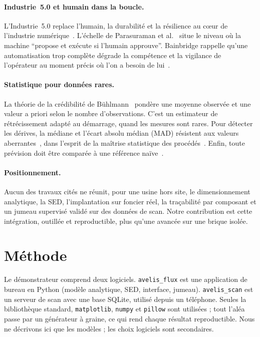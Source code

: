 \documentclass[11pt,a4paper]{article}
\newcommand{\code}[1]{\texttt{#1}}
\begin{document}
\paragraph{Industrie~5.0 et humain dans la boucle.} L'Industrie~5.0 replace l'humain, la
durabilité et la résilience au c\oe ur de l'industrie
numérique~\cite{breque2021,nahavandi2019,xu2021}. L'échelle de Parasuraman et al.~\cite{parasuraman2000}
situe le niveau où la machine \enquote{propose et exécute si l'humain approuve}. Bainbridge
rappelle qu'une automatisation trop complète dégrade la compétence et la vigilance de l'opérateur
au moment précis où l'on a besoin de lui~\cite{bainbridge1983}.

\paragraph{Statistique pour données rares.} La théorie de la crédibilité de Bühlmann~\cite{buhlmann1967}
pondère une moyenne observée et une valeur a priori selon le nombre d'observations. C'est un
estimateur de rétrécissement adapté au démarrage, quand les mesures sont rares. Pour détecter les
dérives, la médiane et l'écart absolu médian (MAD) résistent aux valeurs
aberrantes~\cite{rousseeuw1993,leys2013}, dans l'esprit de la maîtrise statistique des
procédés~\cite{montgomery2009}. Enfin, toute prévision doit être comparée à une référence
naïve~\cite{hyndman2021}.

\paragraph{Positionnement.} Aucun des travaux cités ne réunit, pour une usine hors site, le
dimensionnement analytique, la SED, l'implantation sur foncier réel, la traçabilité par
composant et un jumeau supervisé validé sur des données de scan. Notre contribution est cette
intégration, outillée et reproductible, plus qu'une avancée sur une brique isolée.

\section{Méthode}\label{sec:methode}

Le démonstrateur comprend deux logiciels. \code{avelis\_flux} est une application de bureau en
Python (modèle analytique, SED, interface, jumeau). \code{avelis\_scan} est un serveur de scan
avec une base SQLite, utilisé depuis un téléphone. Seules la bibliothèque standard,
\code{matplotlib}, \code{numpy} et \code{pillow} sont utilisées ; tout l'aléa passe par un
générateur à graine, ce qui rend chaque résultat reproductible. Nous ne décrivons ici que les
modèles ; les choix logiciels sont secondaires.
\end{document}
